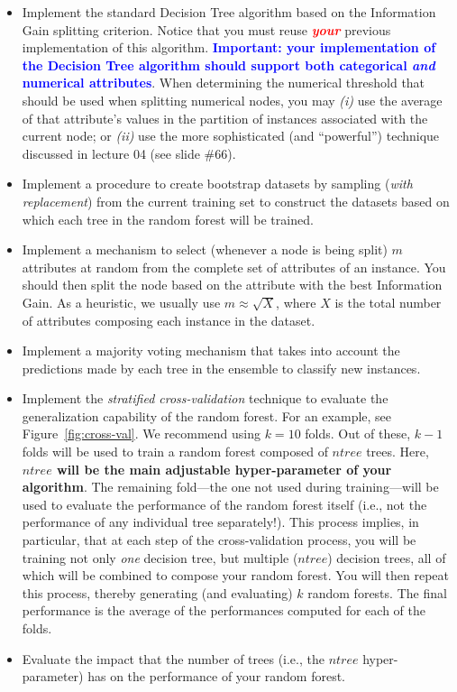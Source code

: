 \documentclass[letterpaper]{article}
\newcommand{\HIGHLIGHT}[1]{\textcolor{blue}{\textbf{#1}}}
\begin{document}
\begin{itemize}
\item Implement the standard Decision Tree algorithm based on the Information Gain splitting criterion. Notice that you must reuse \textbf{\textcolor{red}{\textit{your}}} previous implementation of this algorithm. \HIGHLIGHT{Important: your implementation of the Decision Tree algorithm should support both categorical \textit{and} numerical attributes}. When determining the numerical threshold that should be used when splitting numerical nodes, you may \textit{(i)} use the average of that attribute's values in the partition of instances associated with the current node; or \textit{(ii)} use the more sophisticated (and ``powerful'') technique discussed in lecture 04 (see slide \#66). 
\item Implement a procedure to create bootstrap datasets by sampling (\textit{with replacement}) from the current training set to construct the datasets based on which each tree in the random forest will be trained. 
\item Implement a mechanism to select (whenever a node is being split) $m$ attributes at random from the complete set of attributes of an instance. You should then split the node based on the attribute with the best Information Gain. As a heuristic, we usually use $m \approx \sqrt{X}$, where $X$ is the total number of attributes composing each instance in the dataset.
\item Implement a majority voting mechanism that takes into account the predictions made by each tree in the ensemble to classify new instances.
\item Implement the \textit{stratified cross-validation} technique to evaluate the generalization capability of the random forest. For an example, see Figure~\ref{fig:cross-val}. We recommend using $k=10$ folds. Out of these, $k-1$ folds will be used to train a random forest composed of $ntree$ trees. Here, \textbf{$ntree$ will be the main adjustable hyper-parameter of your algorithm}. The remaining fold---the one not used during training---will be used to evaluate the performance of the random forest itself (i.e., not the performance of any individual tree separately!). This process implies, in particular, that at each step of the cross-validation process, you will be training not only \textit{one} decision tree, but multiple ($ntree$) decision trees, all of which will be combined to compose your random forest. You will then repeat this process, thereby generating (and evaluating) $k$ random forests. The final performance is the average of the performances computed for each of the folds.
\item Evaluate the impact that the number of trees (i.e., the $ntree$ hyper-parameter) has on the performance of your random forest.


\end{itemize}
\end{document}
